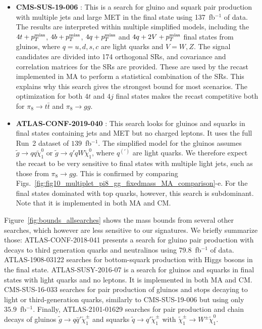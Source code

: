 \documentclass[preprintnumbers,nofootinbib,showpacs,eqsecnum,pre,12pt]{revtex4-1}
\def\ptmiss{p_{T}^{\rm miss}}
\begin{document}
\begin{itemize}
	\item \textbf{CMS-SUS-19-006} \cite{CMS:2019zmd}: This is a search for gluino and squark pair production with multiple jets and large MET in the final state using 137~fb$^{-1}$ of data.
	The results are interpreted within multiple simplified models, including the $4t+\ptmiss$, $4b+\ptmiss$, $4q+\ptmiss$ and $4q+2V+\ptmiss$ final states from gluinos, where $q=u,d,s,c$ are light quarks and $V=W,Z$.
	The signal candidates are divided into 174 orthogonal SRs, and covariance and correlation matrices for the SRs are provided.
	These are used by the recast implemented in MA \cite{Mrowietz:2020ztq} to perform a statistical combination of the SRs.
	This explains why this search gives the strongest bound for most scenarios.
	The optimization for both $4t$ and $4j$ final states makes the recast competitive both for $\pi_8\to t\bar t$ and $\pi_8\to gg$.
	
	\item \textbf{ATLAS-CONF-2019-040} \cite{ATLAS:2019vcq}: This search looks for gluinos and squarks in final states containing jets and MET but no charged leptons.
	It uses the full Run~2 dataset of $139$~fb$^{-1}$. 
	The simplified model for the gluinos assumes $\tilde g\to qq\tilde \chi^0_1$ or $\tilde g\to q'q W \tilde \chi_1^0$, where $q^{(\prime)}$ are light quarks.
	We therefore expect the recast to be very sensitive to final states with multiple light jets, such as those from $\pi_8\to gg$.
	This is confirmed by comparing Figs.~\ref{fig:fig10_multiplet_pi8_gg_fixedmass_MA_comparison}-e.
	For the final states dominated with top quarks, however, this search is subdominant.
	Note that it is implemented in both MA and CM.
\end{itemize}


Figure~\ref{fig:bounds_allsearches}  shows the mass bounds from several other searches, which however are less sensitive to our signatures. 
We briefly summarize those:
ATLAS-CONF-2018-041 \cite{ATLAS:2018yhd} presents a search for gluino pair production with decays to third generation quarks and neutralinos using 79.8~fb$^{-1}$ of data.
ATLAS-1908-03122  \cite{ATLAS:2019gdh} searches for bottom-squark production with Higgs bosons in the final state.
ATLAS-SUSY-2016-07 \cite{ATLAS:2017mjy} is a search for gluinos and squarks in final states with light quarks and no leptons.
It is implemented in both MA and CM.
CMS-SUS-16-033 \cite{CMS:2017abv} searches for pair production of gluinos and stops decaying to light or third-generation quarks, similarly to CMS-SUS-19-006 but using only $35.9$~fb$^{-1}$.
Finally, ATLAS-2101-01629 \cite{ATLAS:2021twp} searches for pair production and chain decays of gluinos $\tilde g\to q\bar q' \tilde \chi_1^\pm $ and squarks $\tilde q\to q'\tilde \chi_1^\pm$ with $\tilde \chi_1^\pm\to W^\pm \tilde \chi_1^0$.

\clearpage



\end{document}

